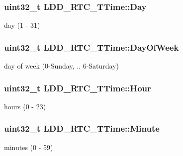 \subsubsection[{Day}]{\setlength{\rightskip}{0pt plus 5cm}uint32\+\_\+t L\+D\+D\+\_\+\+R\+T\+C\+\_\+\+T\+Time\+::\+Day}\label{struct_l_d_d___r_t_c___t_time_acc1084e0fd686c588a2947c2f109634f}
day (1 -\/ 31) \hypertarget{struct_l_d_d___r_t_c___t_time_a43ba06409c4d35f48d732cb61ff5aed0}{}
\subsubsection[{Day\+Of\+Week}]{\setlength{\rightskip}{0pt plus 5cm}uint32\+\_\+t L\+D\+D\+\_\+\+R\+T\+C\+\_\+\+T\+Time\+::\+Day\+Of\+Week}\label{struct_l_d_d___r_t_c___t_time_a43ba06409c4d35f48d732cb61ff5aed0}
day of week (0-\/\+Sunday, .. 6-\/\+Saturday) \hypertarget{struct_l_d_d___r_t_c___t_time_ade2d4bed82069483da14cfe2ede6fef9}{}
\subsubsection[{Hour}]{\setlength{\rightskip}{0pt plus 5cm}uint32\+\_\+t L\+D\+D\+\_\+\+R\+T\+C\+\_\+\+T\+Time\+::\+Hour}\label{struct_l_d_d___r_t_c___t_time_ade2d4bed82069483da14cfe2ede6fef9}
hours (0 -\/ 23) \hypertarget{struct_l_d_d___r_t_c___t_time_a5cd7a1478dd5dd319fb5837bfbf5459f}{}
\subsubsection[{Minute}]{\setlength{\rightskip}{0pt plus 5cm}uint32\+\_\+t L\+D\+D\+\_\+\+R\+T\+C\+\_\+\+T\+Time\+::\+Minute}\label{struct_l_d_d___r_t_c___t_time_a5cd7a1478dd5dd319fb5837bfbf5459f}
minutes (0 -\/ 59) \hypertarget{struct_l_d_d___r_t_c___t_time_a2de1da3c8e42665975c2469125b04dfd}{}
